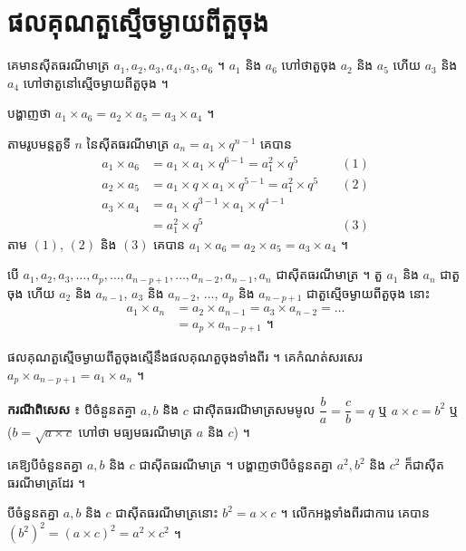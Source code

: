 \section{ផលគុណតួស្មើចម្ងាយពីតួចុង}

\begin{example}[ឧទាហរណ៍]
គេមានស៊ីតធរណីមាត្រ $a_1, a_2, a_3, a_4, a_5, a_6$ ។ $a_1$ និង $a_6$ ហៅថាតួចុង $a_2$ និង $a_5$ ហើយ $a_3$ និង $a_4$ ហៅថាតួនៅស្មើចម្ងាយពីតួចុង ។

បង្ហាញថា $a_1 \times a_6 = a_2 \times a_5 = a_3 \times a_4$ ។

តាមរូបមន្តតួទី $n$ នៃស៊ីតធរណីមាត្រ $a_n = a_1 \times q^{n-1}$ គេបាន
\[
\begin{aligned}
a_1 \times a_6 &= a_1 \times a_1 \times q^{6-1} = a_1^2 \times q^5 &\quad (1)\\
a_2 \times a_5 &= a_1 \times q \times a_1 \times q^{5-1} = a_1^2 \times q^5 &\quad (2)\\
a_3 \times a_4 &= a_1 \times q^{3-1} \times a_1 \times q^{4-1}\\
&= a_1^2 \times q^5 &\quad (3)
\end{aligned}
\]
តាម $(1)$, $(2)$ និង $(3)$ គេបាន $a_1 \times a_6 = a_2 \times a_5 = a_3 \times a_4$ ។
\end{example}

បើ $a_1, a_2, a_3, \ldots, a_p, \ldots, a_{n-p+1}, \ldots, a_{n-2}, a_{n-1}, a_n$ ជាស៊ីតធរណីមាត្រ ។ តួ $a_1$ និង $a_n$ ជាតួចុង ហើយ $a_2$ និង $a_{n-1}$, $a_3$ និង $a_{n-2}$, $\ldots$, $a_p$ និង $a_{n-p+1}$ ជាតួស្មើចម្ងាយពីតួចុង នោះ
\[
\begin{aligned}
a_1 \times a_n &= a_2 \times a_{n-1} = a_3 \times a_{n-2} = \ldots\\
&= a_p \times a_{n-p+1} \text{ ។}
\end{aligned}
\]

\begin{formulaBox}[ជាទូទៅ]
ផលគុណតួស្មើចម្ងាយពីតួចុងស្មើនឹងផលគុណតួចុងទាំងពីរ ។ គេកំណត់សរសេរ $a_p \times a_{n-p+1} = a_1 \times a_n$ ។

\textbf{ករណីពិសេស} ៖ បីចំនួនតគ្នា $a, b$ និង $c$ ជាស៊ីតធរណីមាត្រសមមូល $\dfrac{b}{a} = \dfrac{c}{b} = q$ ឬ $a \times c = b^2$ ឬ ($b = \sqrt{a \times c}$ ហៅថា មធ្យមធរណីមាត្រ $a$ និង $c$) ។
\end{formulaBox}

\begin{example}[លំហាត់គំរូ]
គេឱ្យបីចំនួនតគ្នា $a, b$ និង $c$ ជាស៊ីតធរណីមាត្រ ។ បង្ហាញថាបីចំនួនតគ្នា $a^2, b^2$ និង $c^2$ ក៏ជាស៊ីតធរណីមាត្រដែរ ។
\end{example}
\ans
បីចំនួនតគ្នា $a, b$ និង $c$ ជាស៊ីតធរណីមាត្រនោះ $b^2 = a \times c$ ។ លើកអង្គទាំងពីរជាការេ គេបាន $(b^2)^2 = (a \times c)^2 = a^2 \times c^2$ ។

